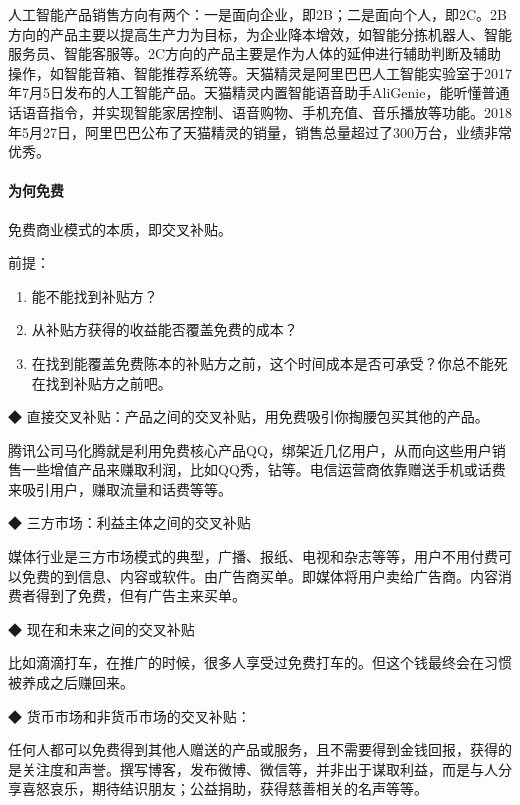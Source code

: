 \documentclass[letterpaper,11pt,english]{sphinxmanual}
\begin{document}
人工智能产品销售方向有两个：一是面向企业，即2B；二是面向个人，即2C。2B方向的产品主要以提高生产力为目标，为企业降本增效，如智能分拣机器人、智能服务员、智能客服等。2C方向的产品主要是作为人体的延伸进行辅助判断及辅助操作，如智能音箱、智能推荐系统等。天猫精灵是阿里巴巴人工智能实验室于2017年7月5日发布的人工智能产品。天猫精灵内置智能语音助手AliGenie，能听懂普通话语音指令，并实现智能家居控制、语音购物、手机充值、音乐播放等功能。2018年5月27日，阿里巴巴公布了天猫精灵的销量，销售总量超过了300万台，业绩非常优秀。


\paragraph{为何免费}
\label{\detokenize{chapter_introduction/money:id19}}
免费商业模式的本质，即交叉补贴。

前提：
\begin{enumerate}
%
\item {} 
能不能找到补贴方？

\item {} 
从补贴方获得的收益能否覆盖免费的成本？

\item {} 
在找到能覆盖免费陈本的补贴方之前，这个时间成本是否可承受？你总不能死在找到补贴方之前吧。

\end{enumerate}

◆ 直接交叉补贴：产品之间的交叉补贴，用免费吸引你掏腰包买其他的产品。

腾讯公司马化腾就是利用免费核心产品QQ，绑架近几亿用户，从而向这些用户销售一些增值产品来赚取利润，比如QQ秀，钻等。电信运营商依靠赠送手机或话费来吸引用户，赚取流量和话费等等。

◆ 三方市场：利益主体之间的交叉补贴

媒体行业是三方市场模式的典型，广播、报纸、电视和杂志等等，用户不用付费可以免费的到信息、内容或软件。由广告商买单。即媒体将用户卖给广告商。内容消费者得到了免费，但有广告主来买单。

◆ 现在和未来之间的交叉补贴

比如滴滴打车，在推广的时候，很多人享受过免费打车的。但这个钱最终会在习惯被养成之后赚回来。

◆ 货币市场和非货币市场的交叉补贴：

任何人都可以免费得到其他人赠送的产品或服务，且不需要得到金钱回报，获得的是关注度和声誉。撰写博客，发布微博、微信等，并非出于谋取利益，而是与人分享喜怒哀乐，期待结识朋友；公益捐助，获得慈善相关的名声等等。
\end{document}

